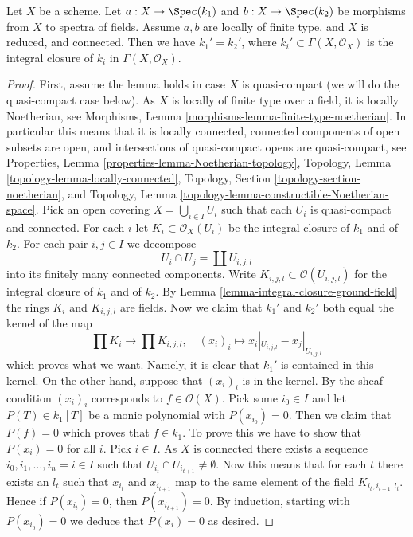 \begin{proposition}
\label{proposition-unique-base-field}
Let $X$ be a scheme. Let $a : X \to \Spec(k_1)$ and
$b : X \to \Spec(k_2)$ be morphisms from $X$ to spectra of fields.
Assume $a, b$ are locally of finite type, and
$X$ is reduced, and connected. Then we have
$k_1' = k_2'$, where $k_i' \subset \Gamma(X, \mathcal{O}_X)$ is
the integral closure of $k_i$ in $\Gamma(X, \mathcal{O}_X)$.
\end{proposition}

\begin{proof}
First, assume the lemma holds in case $X$ is quasi-compact (we will
do the quasi-compact case below).
As $X$ is locally of finite type over a field, it is locally Noetherian, see
Morphisms, Lemma \ref{morphisms-lemma-finite-type-noetherian}.
In particular this means that it is locally connected,
connected components of open subsets are open, and
intersections of quasi-compact opens are quasi-compact, see
Properties, Lemma \ref{properties-lemma-Noetherian-topology},
Topology, Lemma \ref{topology-lemma-locally-connected},
Topology, Section \ref{topology-section-noetherian}, and
Topology, Lemma \ref{topology-lemma-constructible-Noetherian-space}.
Pick an open covering $X = \bigcup_{i \in I} U_i$
such that each $U_i$ is quasi-compact and connected.
For each $i$ let $K_i \subset \mathcal{O}_X(U_i)$ be the integral
closure of $k_1$ and of $k_2$.
For each pair $i, j \in I$ we decompose
$$
U_i \cap U_j = \coprod U_{i, j, l}
$$
into its finitely many connected components. Write
$K_{i, j, l} \subset \mathcal{O}(U_{i, j, l})$
for the integral closure of $k_1$ and of $k_2$. By
Lemma \ref{lemma-integral-closure-ground-field}
the rings $K_i$ and $K_{i, j, l}$ are fields.
Now we claim that $k_1'$ and $k_2'$ both equal the kernel of the map
$$
\prod K_i \longrightarrow \prod K_{i, j, l}, \quad
(x_i)_i \longmapsto x_i|_{U_{i, j, l}} - x_j|_{U_{i, j, l}}
$$
which proves what we want.
Namely, it is clear that $k_1'$ is contained in this kernel.
On the other hand, suppose that $(x_i)_i$ is in the kernel.
By the sheaf condition $(x_i)_i$ corresponds to $f \in \mathcal{O}(X)$.
Pick some $i_0 \in I$ and let $P(T) \in k_1[T]$ be a monic polynomial
with $P(x_{i_0}) = 0$. Then we claim that $P(f) = 0$ which proves
that $f \in k_1$. To prove this we have to show that $P(x_i) = 0$
for all $i$. Pick $i \in I$. As $X$ is connected there exists a
sequence $i_0, i_1, \ldots, i_n = i \in I$ such that
$U_{i_t} \cap U_{i_{t + 1}} \not = \emptyset$. Now this means that
for each $t$ there exists an $l_t$ such that $x_{i_t}$ and
$x_{i_{t + 1}}$ map to the same element of the field $K_{i_t, i_{t + 1}, l_t}$.
Hence if $P(x_{i_t}) = 0$, then $P(x_{i_{t + 1}}) = 0$. By
induction, starting with $P(x_{i_0}) = 0$ we deduce that
$P(x_i) = 0$ as desired.


\end{proof}
